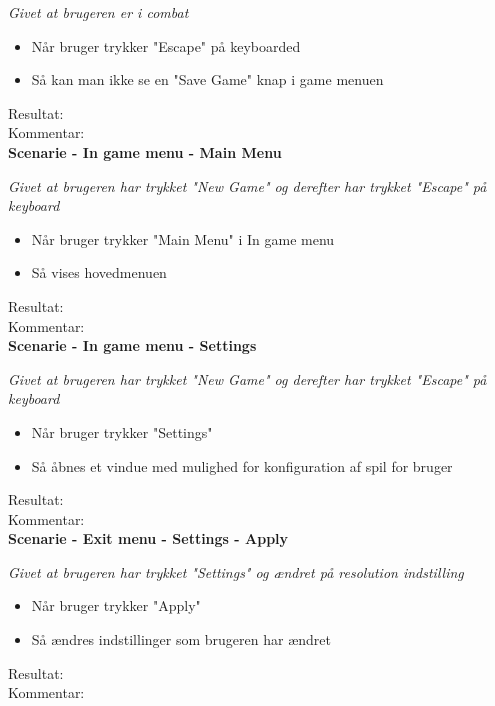 \it{Givet at brugeren er i combat}

\begin{itemize}
  \item Når bruger trykker "Escape" på keyboarded
  \item Så kan man ikke se en "Save Game" knap i game menuen
\end{itemize}

Resultat:\\
Kommentar:\\

\bf{Scenarie - In game menu - Main Menu}

\it{Givet at brugeren har trykket "New Game" og derefter har trykket "Escape" på keyboard}

\begin{itemize}
  \item Når bruger trykker "Main Menu" i In game menu
  \item Så vises hovedmenuen
\end{itemize}

Resultat:\\
Kommentar:\\

\bf{Scenarie - In game menu - Settings}

\it{Givet at brugeren har trykket "New Game" og derefter har trykket "Escape" på keyboard}

\begin{itemize}
  \item Når bruger trykker "Settings"
  \item Så åbnes et vindue med mulighed for konfiguration af spil for bruger
\end{itemize}

Resultat:\\
Kommentar:\\

\bf{Scenarie - Exit menu - Settings - Apply}

\it{Givet at brugeren har trykket "Settings" og ændret på resolution indstilling}

\begin{itemize}
  \item Når bruger trykker "Apply"
  \item Så ændres indstillinger som brugeren har ændret
\end{itemize}

Resultat:\\
Kommentar:\\

